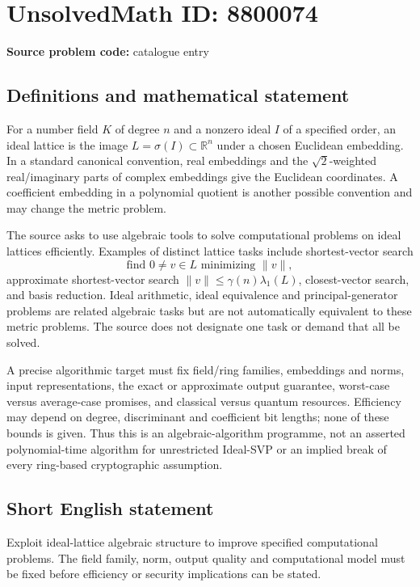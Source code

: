 \documentclass[11pt]{article}
\newcommand{\R}{\mathbb{R}}
\begin{document}
\section*{UnsolvedMath ID: 8800074}
\textbf{Source problem code:} catalogue entry
\subsection{Definitions and mathematical statement}
For a number field $K$ of degree $n$ and a nonzero ideal $I$ of a specified order, an ideal lattice is the image $L=\sigma(I)\subset\R^n$ under a chosen Euclidean embedding. In a standard canonical convention, real embeddings and the $\sqrt2$-weighted real/imaginary parts of complex embeddings give the Euclidean coordinates. A coefficient embedding in a polynomial quotient is another possible convention and may change the metric problem.

The source asks to use algebraic tools to solve computational problems on ideal lattices efficiently. Examples of distinct lattice tasks include shortest-vector search
\[
\text{find }0\ne v\in L\text{ minimizing }\|v\|,
\]
approximate shortest-vector search $\|v\|\leq\gamma(n)\lambda_1(L)$, closest-vector search, and basis reduction. Ideal arithmetic, ideal equivalence and principal-generator problems are related algebraic tasks but are not automatically equivalent to these metric problems. The source does not designate one task or demand that all be solved.

A precise algorithmic target must fix field/ring families, embeddings and norms, input representations, the exact or approximate output guarantee, worst-case versus average-case promises, and classical versus quantum resources. Efficiency may depend on degree, discriminant and coefficient bit lengths; none of these bounds is given. Thus this is an algebraic-algorithm programme, not an asserted polynomial-time algorithm for unrestricted Ideal-SVP or an implied break of every ring-based cryptographic assumption.
\subsection{Short English statement}
Exploit ideal-lattice algebraic structure to improve specified computational problems. The field family, norm, output quality and computational model must be fixed before efficiency or security implications can be stated.
\end{document}
